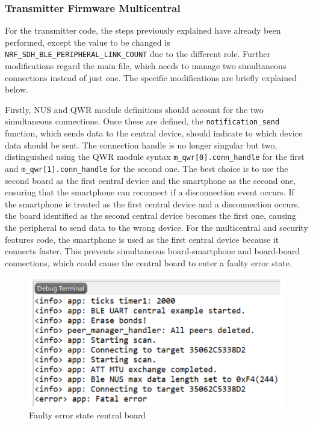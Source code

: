 \documentclass{Configuration_Files/PoliMi3i_thesis}
\begin{document}
\subsubsection{Transmitter Firmware Multicentral}
For the transmitter code, the steps previously explained have already been performed, except the value to be changed is \texttt{NRF\_SDH\_BLE\_PERIPHERAL\_LINK\_COUNT} due to the different role. Further modifications regard the main file, which needs to manage two simultaneous connections instead of just one. The specific modifications are briefly explained below.

Firstly, NUS and QWR module definitions should account for the two simultaneous connections. Once these are defined, the \texttt{notification\_send} function, which sends data to the central device, should indicate to which device data should be sent. The connection handle is no longer singular but two, distinguished using the QWR module syntax \texttt{m\_qwr[0].conn\_handle} for the first and \texttt{m\_qwr[1].conn\_handle} for the second one. The best choice is to use the second board as the first central device and the smartphone as the second one, ensuring that the smartphone can reconnect if a disconnection event occurs. If the smartphone is treated as the first central device and a disconnection occurs, the board identified as the second central device becomes the first one, causing the peripheral to send data to the wrong device. For the multicentral and security features code, the smartphone is used as the first central device because it connects faster. This prevents simultaneous board-smartphone and board-board connections, which could cause the central board to enter a faulty error state.

\begin{figure}[H]
    \centering
    \includegraphics[scale=0.6]{Multicentral/5.png}
    \caption{Faulty error state central board}
    \label{multicentral_5}
\end{figure}
\end{document}
